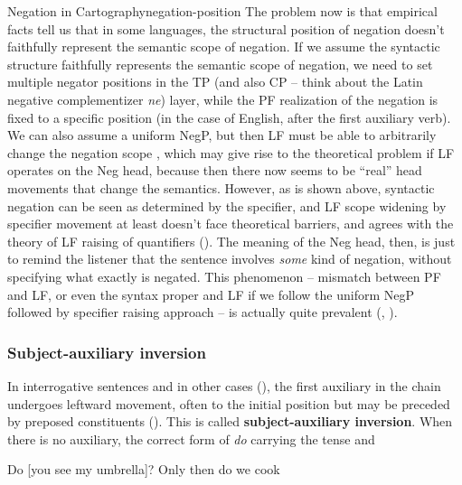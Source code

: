 \documentclass[UTF8, a4paper, oneside, scheme=plain]{ctexrep}
\newcommand*{\concept}[1]{\textbf{#1}}
\newcommand{\corpus}[1]{\emph{#1}}
\begin{document}
\begin{theorybox}{Negation in Cartography}{negation-position}
    The problem now is that empirical facts tell us that 
    in some languages, the structural position of negation 
    doesn't faithfully represent the semantic scope of negation.
    If we assume the syntactic structure faithfully 
    represents the semantic scope of negation,
    we need to set multiple negator positions in the TP 
    (and also CP -- think about the Latin negative complementizer \corpus{ne})
    layer, while the PF realization of the negation is fixed to a specific position 
    (in the case of English, after the first auxiliary verb).
    We can also assume a uniform NegP,
    but then LF must be able to arbitrarily change the negation scope \citep{moscati2012cartography},
    which may give rise to the theoretical problem 
    if LF operates on the Neg head,
    because then there now seems to be ``real'' head movements that change the semantics.
    However, as is shown above, syntactic negation can be seen as determined by the specifier,
    and LF scope widening by specifier movement at least doesn't face theoretical barriers,
    and agrees with the theory of LF raising of quantifiers ().
    The meaning of the Neg head, then,
    is just to remind the listener that the sentence involves \emph{some} kind of negation,
    without specifying what exactly is negated.
    This phenomenon -- mismatch between PF and LF, 
    or even the syntax proper and LF 
    if we follow the uniform NegP followed by specifier raising approach --
    is actually quite prevalent (, ).
\end{theorybox}

\subsubsection{Subject-auxiliary inversion}\label{sec:sai}

In interrogative sentences and in other cases (),  
the first auxiliary in the chain undergoes leftward movement,
often to the initial position but may be preceded by preposed constituents (). 
This is called \concept{subject-auxiliary inversion}.
When there is no auxiliary, 
the correct form of \corpus{do} carrying the tense and 

\begin{exe}
    \ex Do [you see my umbrella]?
    \ex Only then do we cook
\end{exe}
\end{document}
